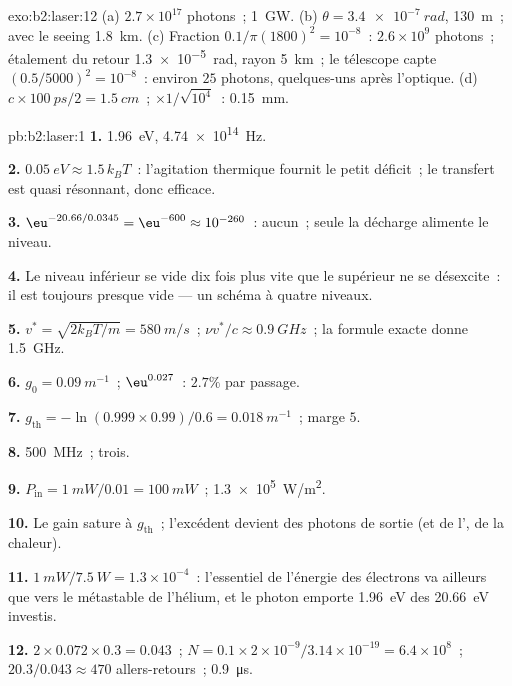 \begin{solution}{exo:b2:laser:12}
(a) $2.7 \times 10^{17}$ photons~; \qty{1}{GW}. (b) $\theta = \qty{3.4e-7}{rad}$,
\qty{130}{m}~; avec le seeing \qty{1.8}{km}. (c) Fraction $0.1/\pi(1800)^2 =
10^{-8}$~: $2.6 \times 10^9$ photons~; étalement du retour \qty{1.3e-5}{rad}, rayon
\qty{5}{km}~; le télescope capte $(0.5/5000)^2 = 10^{-8}$~: environ $25$
photons, quelques-uns après l'optique. (d) $c \times \qty{100}{ps}/2 = \qty{1.5}{cm}$~;
$\times 1/\sqrt{10^4}$~: \qty{0.15}{mm}.
\end{solution}

\begin{solution}{pb:b2:laser:1}
\textbf{1.} \qty{1.96}{eV}, \qty{4.74e14}{Hz}.

\textbf{2.} $\qty{0.05}{eV} \approx 1.5\,k_BT$~: l'agitation thermique fournit
le petit déficit~; le transfert est quasi résonnant, donc efficace.

\textbf{3.} $\eu^{-20.66/0.0345} = \eu^{-600} \approx 10^{-260}$~: aucun~; seule la
décharge alimente le niveau.

\textbf{4.} Le niveau inférieur se vide dix fois plus vite que le supérieur
ne se désexcite~: il est toujours presque vide --- un schéma à quatre niveaux.

\textbf{5.} $v^* = \sqrt{2k_BT/m} = \qty{580}{m/s}$~; $\nu v^*/c \approx \qty{0.9}{GHz}$~;
la formule exacte donne \qty{1.5}{GHz}.

\textbf{6.} $g_0 = \qty{0.09}{m^{-1}}$~; $\eu^{0.027}$~: $2.7\%$ par passage.

\textbf{7.} $g_{\text{th}} = -\ln(0.999 \times 0.99)/0.6 = \qty{0.018}{m^{-1}}$~;
marge $5$.

\textbf{8.} \qty{500}{MHz}~; trois.

\textbf{9.} $P_{\text{in}} = \qty{1}{mW}/0.01 = \qty{100}{mW}$~; \qty{1.3e5}{W/m^2}.

\textbf{10.} Le gain sature à $g_{\text{th}}$~; l'excédent devient des
photons de sortie (et de l', de la chaleur).

\textbf{11.} $\qty{1}{mW}/\qty{7.5}{W} = 1.3 \times 10^{-4}$~: l'essentiel de
l'énergie des électrons va ailleurs que vers le métastable de l'hélium, et le
photon emporte \qty{1.96}{eV} des \qty{20.66}{eV} investis.

\textbf{12.} $2 \times 0.072 \times 0.3 = 0.043$~; $N = 0.1 \times 2 \times 10^{-9}/3.14
\times 10^{-19} = 6.4 \times 10^8$~; $20.3/0.043 \approx 470$ allers-retours~;
\qty{0.9}{\micro s}.


\end{solution}
